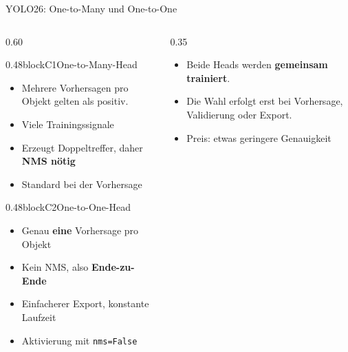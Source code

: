 \begin{frame}{YOLO26: One-to-Many und One-to-One}
\footnotesize
{}
\begin{columns}
\begin{column}{0.60\textwidth}
\begin{blockrow}
  \begin{blockcol}{0.48\linewidth}{blockC1}{One-to-Many-Head}
    \begin{itemize}
      \item Mehrere Vorhersagen pro Objekt gelten als positiv.
      \item Viele Trainingssignale
      \item Erzeugt Doppeltreffer, daher \textbf{NMS nötig}
      \item Standard bei der Vorhersage
    \end{itemize}
  \end{blockcol}
  \begin{blockcol}{0.48\linewidth}{blockC2}{One-to-One-Head}
    \begin{itemize}
      \item Genau \textbf{eine} Vorhersage pro Objekt
      \item Kein NMS, also \textbf{Ende-zu-Ende}
      \item Einfacherer Export, konstante Laufzeit
      \item Aktivierung mit \texttt{nms=False}
    \end{itemize}
  \end{blockcol}
\end{blockrow}
\end{column}
\begin{column}{0.35\textwidth}
\begin{itemize}
  \item Beide Heads werden \textbf{gemeinsam trainiert}.
  \item Die Wahl erfolgt erst bei Vorhersage, Validierung oder Export.
  \item Preis: etwas geringere Genauigkeit
\end{itemize}
\end{column}
\end{columns}


\end{frame}
